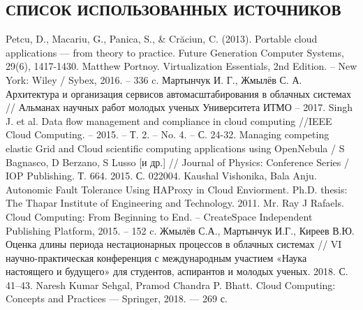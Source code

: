\begin{center}
\section*{СПИСОК ИСПОЛЬЗОВАННЫХ ИСТОЧНИКОВ}
\end{center}
\begingroup
\renewcommand{\section}[2]{}%
\begin{thebibliography}{40}
Petcu, D., Macariu, G., Panica, S., \& Crăciun, C. (2013). Portable cloud applications --- from theory to practice. Future Generation Computer Systems, 29(6), 1417-1430.
Matthew Portnoy. Virtualization Essentials, 2nd Edition. – New York: Wiley / Sybex, 2016. – 336 c.
Мартынчук И. Г., Жмылёв С. А. Архитектура и организация сервисов автомасштабирования в облачных системах // Альманах научных работ молодых ученых Университета ИТМО – 2017.
Singh J. et al. Data flow management and compliance in cloud computing //IEEE Cloud Computing. – 2015. – Т. 2. – No. 4. – С. 24-32.
Managing competing elastic Grid and Cloud scientific computing applications using OpenNebula / S Bagnasco, D Berzano, S Lusso [и др.] // Journal of Physics: Conference Series / IOP Publishing. Т. 664. 2015. С. 022004.
Kaushal Vishonika, Bala Anju. Autonomic Fault Tolerance Using HAProxy in Cloud Enviorment. Ph.D. thesis: The Thapar Institute of Engineering and Technology. 2011.
Mr. Ray J Rafaels. Cloud Computing: From Beginning to End. – CreateSpace Independent Publishing Platform, 2015. – 152 c.
Жмылёв С.А., Мартынчук И.Г., Киреев В.Ю. Оценка длины периода нестационарных процессов в облачных системах // VI научно-практическая конференция с международным участием «Наука настоящего и будущего» для студентов, аспирантов и молодых ученых. 2018. С. 41–43.
Naresh Kumar Sehgal, Pramod Chandra P. Bhatt. Cloud Computing: Concepts and Practices --- Springer, 2018. --- 269 с.

\end{thebibliography}
